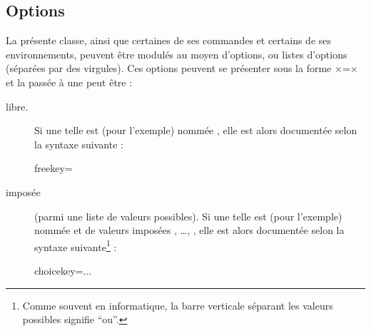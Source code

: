 \documentclass[french,nolocaltoc]{nwejmart}
\newtheorem[style=definition]{fait}
\newtheorem[title=contraventionnalisation]{ctrv}
\newtheorem[title-plural=anneaux]{anneau}
\newtheorem[title-plural=idéaux]{idéal}
\begin{document}
\subsection{Options}
\label{sec-options}

La présente classe, ainsi que certaines de ses commandes et certains de ses
environnements, peuvent être modulés au moyen d'options, ou listes d'options
(séparées par des virgules). Ces options peuvent se présenter sous la forme
×=× et la  passée à une  peut
être :
\begin{description}
\item[libre.] Si une telle  est (pour l'exemple) nommée
  , elle est alors documentée selon la syntaxe suivante :
  \begin{docKey*}{freekey}{=}{}
  \end{docKey*}
\item[imposée] (parmi une liste de valeurs possibles). Si une telle  est
   (pour l'exemple) nommée  et de valeurs imposées
  , \dots{}, , elle est alors
  documentée selon la syntaxe suivante\footnote{Comme souvent en informatique,
    la barre verticale séparant les valeurs possibles signifie \enquote{ou}.} :
  \begin{docKey*}{choicekey}{=\textbar...\textbar{}}{}
  \end{docKey*}
\end{description}
\end{document}
